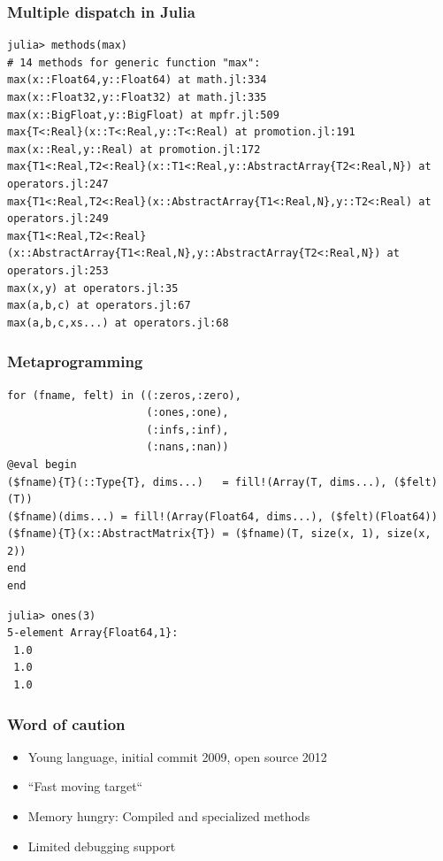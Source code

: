 \documentclass{beamer}
\begin{document}
\begin{frame}[fragile]\frametitle{Multiple dispatch in Julia}
{\small
\begin{verbatim}
julia> methods(max)
# 14 methods for generic function "max":
max(x::Float64,y::Float64) at math.jl:334
max(x::Float32,y::Float32) at math.jl:335
max(x::BigFloat,y::BigFloat) at mpfr.jl:509
max{T<:Real}(x::T<:Real,y::T<:Real) at promotion.jl:191
max(x::Real,y::Real) at promotion.jl:172
max{T1<:Real,T2<:Real}(x::T1<:Real,y::AbstractArray{T2<:Real,N}) at operators.jl:247
max{T1<:Real,T2<:Real}(x::AbstractArray{T1<:Real,N},y::T2<:Real) at operators.jl:249
max{T1<:Real,T2<:Real}(x::AbstractArray{T1<:Real,N},y::AbstractArray{T2<:Real,N}) at operators.jl:253
max(x,y) at operators.jl:35
max(a,b,c) at operators.jl:67
max(a,b,c,xs...) at operators.jl:68
\end{verbatim}
}
\end{frame}



\begin{frame}[fragile]\frametitle{Metaprogramming}
{\small
\begin{verbatim}
for (fname, felt) in ((:zeros,:zero),
                      (:ones,:one),
                      (:infs,:inf), 
                      (:nans,:nan))
@eval begin
($fname){T}(::Type{T}, dims...)   = fill!(Array(T, dims...), ($felt)(T))
($fname)(dims...) = fill!(Array(Float64, dims...), ($felt)(Float64))
($fname){T}(x::AbstractMatrix{T}) = ($fname)(T, size(x, 1), size(x, 2))
end
end
\end{verbatim}
}
{
\small
\begin{verbatim}
julia> ones(3)
5-element Array{Float64,1}:
 1.0
 1.0
 1.0
\end{verbatim}
}

\end{frame}

\begin{frame}\frametitle{Word of caution}
\begin{itemize}
\item Young language, initial commit 2009, open source 2012
\item ``Fast moving target``
\item Memory hungry: Compiled and specialized methods
\item Limited debugging support
\end{itemize}
\end{frame}
\end{document}
